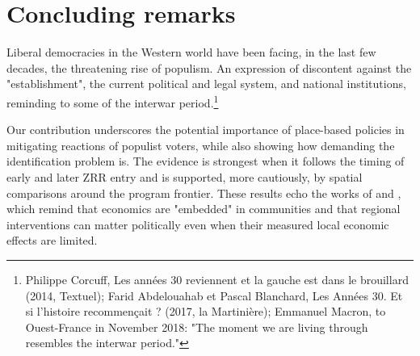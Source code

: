 \documentclass[12pt,a4paper]{article}
\begin{document}









\section{Concluding remarks}\label{conclusion}

Liberal democracies in the Western world have been facing, in the last few decades, the threatening rise of populism. An expression of discontent against the "establishment", the current political and legal system, and national institutions, reminding to some of the interwar period.\footnote{Philippe Corcuff, Les années 30 reviennent et la gauche est dans le brouillard (2014, Textuel); Farid Abdelouahab et Pascal Blanchard, Les Années 30. Et si l'histoire recommençait ? (2017, la Martinière); Emmanuel Macron, to Ouest-France in November 2018: "The moment we are living through resembles the interwar period."}

Our contribution underscores the potential importance of place-based policies in mitigating reactions of populist voters, while also showing how demanding the identification problem is. The evidence is strongest when it follows the timing of early and later ZRR entry and is supported, more cautiously, by spatial comparisons around the program frontier. These results echo the works of \cite{Rajan} and \cite{polanyi1944}, which remind that economics are "embedded" in communities and that regional interventions can matter politically even when their measured local economic effects are limited.





\printbibliography
\newpage


\end{document}

